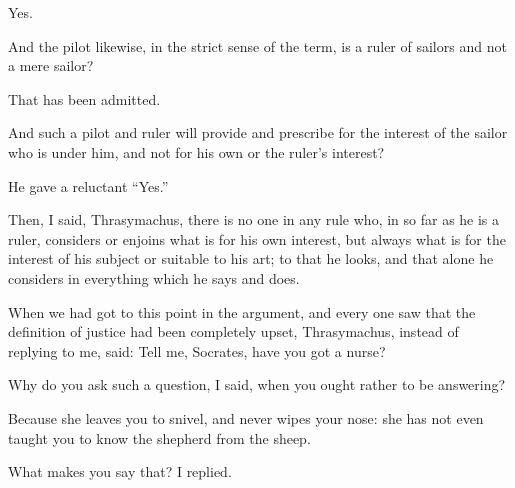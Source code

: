 Yes.

And the pilot likewise, in the strict sense of the term, is a ruler of
sailors and not a mere sailor?

That has been admitted.

And such a pilot and ruler will provide and prescribe for the interest
of the sailor who is under him, and not for his own or the ruler's
interest?

He gave a reluctant ``Yes.''

Then, I said, Thrasymachus, there is no one in any rule who, in so far
as he is a ruler, considers or enjoins what is for his own interest, but
always what is for the interest of his subject or suitable to his art;
to that he looks, and that alone he considers in everything which he
says and does.

When we had got to this point in the argument, and every one saw that
the definition of justice had been completely upset, Thrasymachus,
instead of replying to me, said: Tell me, Socrates, have you got a
nurse?

Why do you ask such a question, I said, when you ought rather to be
answering?

Because she leaves you to snivel, and never wipes your nose: she has not
even taught you to know the shepherd from the sheep.

What makes you say that? I replied.

